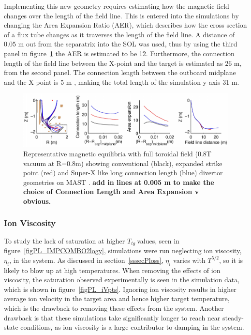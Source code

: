 \documentclass[11pt]{article}  %
\providecommand{\Ttg}{$T_{tg}~$} %
\begin{document}
Implementing this new geometry requires estimating how the magnetic field changes over the length of the field line. This is entered into the simulations by changing the Area Expansion Ratio (AER), which describes how the cross section of a flux tube changes as it traverses the length of the field line. A distance of $0.05$ m out from the separatrix into the SOL was used, thus by using the third panel in figure~\ref{figMASTUdesignpapersFig2} the AER is estimated to be 12. Furthermore, the connection length of the field line between the X-point and the target is estimated as $26$ m, from the second panel. The connection length between the outboard midplane and the X-point is $5$ m \cite{Fishpool2013}, making the total length of the simulation y-axis $31$ m.

\begin{figure}
\includegraphics[scale=0.55]{Figures/MASTUdesignpapersFig2.png}
\centering
\caption{Representative magnetic equilibria with full toroidal field (0.8T vacuum at R=0.8m) showing conventional (black), expanded strike point (red) and Super-X like long connection length (blue) divertor geometries on MAST \cite{Fishpool2013}. \textbf{add in lines at 0.005 m to make the choice of Connection Length and Area Expansion v obvious.}}\label{figMASTUdesignpapersFig2}
\end{figure}


\subsubsection{Ion Viscosity}\label{sssecIonviscosity}
To study the lack of saturation at higher \Ttg values, seen in figure~\ref{figPL_IMPCOMBO2logy}, simulations were run neglecting ion viscosity, $\eta_i$, in the system. As discussed in section~\ref{sssecPloss}, $\eta_i$ varies with $T^{5/2}$, so it is likely to blow up at high temperatures. When removing the effects of ion viscosity, the saturation observed experimentally is seen in the simulation data, which is shown in figure~\ref{figPL_iVpts}. Ignoring ion viscosity results in higher average ion velocity in the target area and hence higher target temperature, which is the drawback to removing these effects from the system. Another drawback is that these simulations take significantly longer to reach near steady-state conditions, as ion viscosity is a large contributor to damping in the system.
\end{document}
